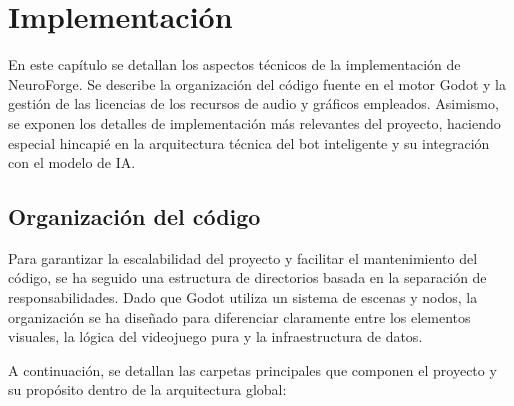 \chapter{Implementación}

En este capítulo se detallan los aspectos técnicos de la implementación de NeuroForge. Se describe la organización del código fuente en el motor Godot y la gestión de las licencias de los recursos de audio y gráficos empleados. Asimismo, se exponen los detalles de implementación más relevantes del proyecto, haciendo especial hincapié en la arquitectura técnica del bot inteligente y su integración con el modelo de IA.

\section{Organización del código}

Para garantizar la escalabilidad del proyecto y facilitar el mantenimiento del código, se ha seguido una estructura de directorios basada en la separación de responsabilidades. Dado que Godot utiliza un sistema de escenas y nodos, la organización se ha diseñado para diferenciar claramente entre los elementos visuales, la lógica del videojuego pura y la infraestructura de datos.

A continuación, se detallan las carpetas principales que componen el proyecto y su propósito dentro de la arquitectura global:

